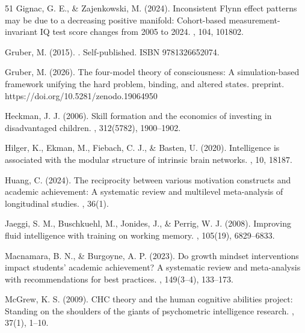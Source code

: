 \documentclass[12pt,a4paper]{article}
\begin{document}
\begin{thebibliography}{51}
Gignac, G. E., \& Zajenkowski, M. (2024).
\newblock Inconsistent Flynn effect patterns may be due to a decreasing positive manifold: Cohort-based measurement-invariant IQ test score changes from 2005 to 2024.
, 104, 101802.

Gruber, M. (2015).
.
\newblock Self-published. ISBN 9781326652074.

Gruber, M. (2026).
\newblock The four-model theory of consciousness: A simulation-based framework unifying the hard problem, binding, and altered states.
 preprint. https://doi.org/10.5281/zenodo.19064950

Heckman, J. J. (2006).
\newblock Skill formation and the economics of investing in disadvantaged children.
, 312(5782), 1900--1902.

Hilger, K., Ekman, M., Fiebach, C. J., \& Basten, U. (2020).
\newblock Intelligence is associated with the modular structure of intrinsic brain networks.
, 10, 18187.

Huang, C. (2024).
\newblock The reciprocity between various motivation constructs and academic achievement: A systematic review and multilevel meta-analysis of longitudinal studies.
, 36(1).

Jaeggi, S. M., Buschkuehl, M., Jonides, J., \& Perrig, W. J. (2008).
\newblock Improving fluid intelligence with training on working memory.
, 105(19), 6829--6833.

Macnamara, B. N., \& Burgoyne, A. P. (2023).
\newblock Do growth mindset interventions impact students' academic achievement? A systematic review and meta-analysis with recommendations for best practices.
, 149(3--4), 133--173.

McGrew, K. S. (2009).
\newblock CHC theory and the human cognitive abilities project: Standing on the shoulders of the giants of psychometric intelligence research.
, 37(1), 1--10.


\end{thebibliography}
\end{document}
